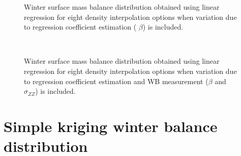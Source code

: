\documentclass{sfuthesis}
\begin{document}
\begin{appendices}
\begin{figure}[H]
	\caption[]{Winter surface mass balance distribution obtained using linear regression for eight density interpolation options when variation due to regression coefficient estimation ( $\beta$) is included. }
	\label{fig:WSMB_LR_Distributionbeta}
\end{figure}
\begin{figure}[H]
	\centering
	\\
	\caption[]{Winter surface mass balance distribution obtained using linear regression for eight density interpolation options when variation due to regression coefficient estimation and WB measurement ($\beta$ and $\sigma_{ZZ}$) is included. }
	\label{fig:WSMB_LR_DistributionbetaNzz}
\end{figure}


\section{Simple kriging winter balance distribution}


\end{appendices}
\end{document}
